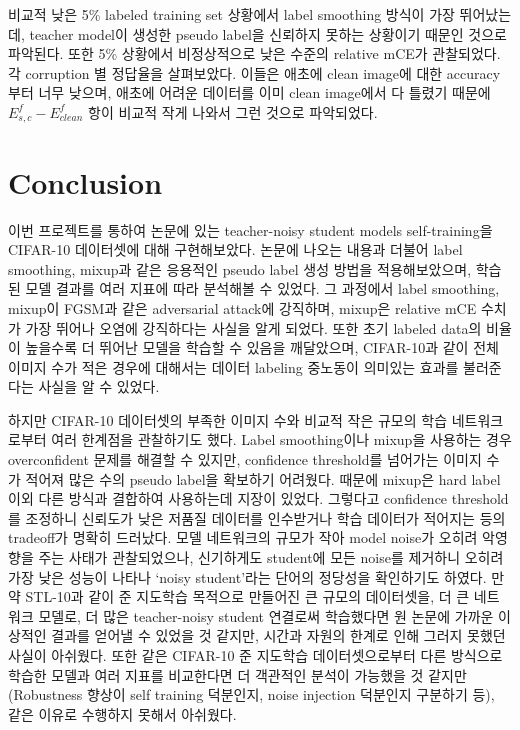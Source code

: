 \documentclass[a4paper, 10pt]{article}
\begin{document}
비교적 낮은 5\% labeled training set 상황에서 label smoothing 방식이 가장
뛰어났는데, teacher model이 생성한 pseudo label을 신뢰하지 못하는 상황이기
때문인 것으로 파악된다. 또한 5\% 상황에서 비정상적으로 낮은 수준의 relative
mCE가 관찰되었다. 각 corruption 별 정답율을 살펴보았다. 이들은 애초에 clean
image에 대한 accuracy부터 너무 낮으며, 애초에 어려운 데이터를 이미 clean
image에서 다 틀렸기 때문에 $E_{s,c}^f - E_{clean}^f$ 항이 비교적 작게 나와서
그런 것으로 파악되었다.


\section{Conclusion}
이번 프로젝트를 통하여 \cite{xie2020selftraining} 논문에 있는 teacher-noisy
student models self-training을 CIFAR-10 데이터셋에 대해 구현해보았다. 논문에
나오는 내용과 더불어 label smoothing, mixup과 같은 응용적인 pseudo label 생성
방법을 적용해보았으며, 학습된 모델 결과를 여러 지표에 따라 분석해볼 수 있었다.
그 과정에서 label smoothing, mixup이 FGSM과 같은 adversarial attack에 강직하며,
mixup은 relative mCE 수치가 가장 뛰어나 오염에 강직하다는 사실을 알게 되었다.
또한 초기 labeled data의 비율이 높을수록 더 뛰어난 모델을 학습할 수 있음을
깨달았으며, CIFAR-10과 같이 전체 이미지 수가 적은 경우에 대해서는 데이터
labeling 중노동이 의미있는 효과를 불러준다는 사실을 알 수 있었다.

하지만 CIFAR-10 데이터셋의 부족한 이미지 수와 비교적 작은 규모의 학습
네트워크로부터 여러 한계점을 관찰하기도 했다. Label smoothing이나 mixup을
사용하는 경우 overconfident 문제를 해결할 수 있지만, confidence threshold를
넘어가는 이미지 수가 적어져 많은 수의 pseudo label을 확보하기 어려웠다. 때문에
mixup은 hard label 이외 다른 방식과 결합하여 사용하는데 지장이 있었다. 그렇다고
confidence threshold를 조정하니 신뢰도가 낮은 저품질 데이터를 인수받거나 학습
데이터가 적어지는 등의 tradeoff가 명확히 드러났다. 모델 네트워크의 규모가 작아
model noise가 오히려 악영향을 주는 사태가 관찰되었으나, 신기하게도 student에
모든 noise를 제거하니 오히려 가장 낮은 성능이 나타나 `noisy student'라는 단어의
정당성을 확인하기도 하였다. 만약 STL-10과 같이 준 지도학습 목적으로 만들어진 큰
규모의 데이터셋을, 더 큰 네트워크 모델로, 더 많은 teacher-noisy student 연결로써
학습했다면 원 논문에 가까운 이상적인 결과를 얻어낼 수 있었을 것 같지만, 시간과
자원의 한계로 인해 그러지 못했던 사실이 아쉬웠다. 또한 같은 CIFAR-10 준 지도학습
데이터셋으로부터 다른 방식으로 학습한 모델과 여러 지표를 비교한다면 더 객관적인
분석이 가능했을 것 같지만(Robustness 향상이 self training 덕분인지, noise
injection 덕분인지 구분하기 등), 같은 이유로 수행하지 못해서 아쉬웠다.
\end{document}
